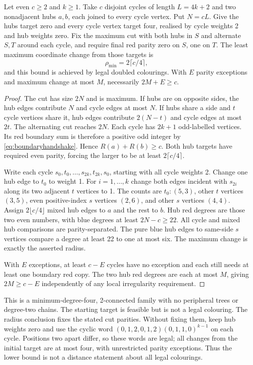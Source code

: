 \begin{proposition}\label{prop:radius}
Let even $c\ge2$ and $k\ge1$. Take $c$ disjoint cycles of length
$L=4k+2$ and two nonadjacent hubs $a,b$, each joined to every cycle
vertex. Put $N=cL$. Give the hubs target zero and every cycle
vertex target four, realised by cycle weights 2 and hub weights
zero. Fix the maximum cut with both hubs in $S$ and alternate
$S,T$ around each cycle, and require final red parity zero on $S$,
one on $T$. The least maximum coordinate change from those targets is
\[
 \rho_{\min}=2\lceil c/4\rceil,
\]
and this bound is achieved by legal doubled colourings. With $E$
parity exceptions and maximum change at most $M$, necessarily
$2M+E\ge c$.
\end{proposition}
\begin{proof}
The cut has size $2N$ and is maximum. If hubs are on opposite sides,
the hub edges contribute $N$ and cycle edges at most $N$. If hubs
share a side and $t$ cycle vertices share it, hub edges contribute
$2(N-t)$ and cycle edges at most $2t$. The alternating cut reaches
$2N$. Each cycle has $2k+1$ odd-labelled vertices. Its red boundary
sum is therefore a positive odd integer by
\eqref{eq:boundaryhandshake}. Hence $R(a)+R(b)\ge c$. Both hub
targets have required even parity, forcing the larger to be at
least $2\lceil c/4\rceil$.

Write each cycle $s_0,t_0,\ldots,s_{2k},t_{2k},s_0$, starting
with all cycle weights 2. Change one hub edge to $t_0$ to weight
1. For $i=1,\ldots,k$ change both edges incident with $s_{2i}$
along its two adjacent $t$ vertices to 1. The counts are
$t_0:(5,3)$, other $t$ vertices $(3,5)$, even positive-index
$s$ vertices $(2,6)$, and other $s$ vertices $(4,4)$.
Assign $2\lfloor c/4\rfloor$ mixed hub edges to $a$ and the rest
to $b$. Hub red degrees are those two even numbers, with blue
degrees at least $2N-c\ge22$. All cycle and mixed hub comparisons
are parity-separated. The pure blue hub edges to same-side $s$
vertices compare a degree at least 22 to one at most six. The
maximum change is exactly the asserted radius.

With $E$ exceptions, at least $c-E$ cycles have no exception and
each still needs at least one boundary red copy. The two hub red
degrees are each at most $M$, giving $2M\ge c-E$ independently
of any local irregularity requirement.
\end{proof}

This is a minimum-degree-four, 2-connected family with no peripheral
trees or degree-two chains. The starting target is feasible but is
not a legal colouring. The radius conclusion fixes the stated cut
parities. Without fixing them, keep hub weights zero and use the
cyclic word $(0,1,2,0,1,2)(0,1,1,0)^{k-1}$ on each cycle.
Positions two apart differ, so these words are legal; all changes
from the initial target are at most four, with unrestricted parity
exceptions. Thus the lower bound is not a distance statement about
all legal colourings.

